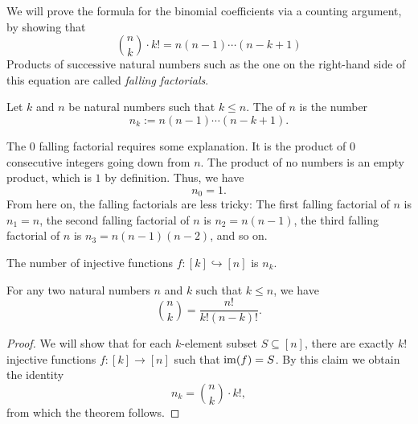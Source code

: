 We will prove the formula for the binomial coefficients via a counting argument, by showing that
\begin{equation*}
  \binom{n}{k}\cdot k!= n(n-1)\cdots (n-k+1)
\end{equation*}
Products of successive natural numbers such as the one on the right-hand side of this equation are called \emph{falling factorials}.

\begin{definition}
  Let $k$ and $n$ be natural numbers such that $k\leq n$. The  of $n$ is the number
  \begin{equation*}
    n_{k}:=n(n-1)\cdots (n-k+1).
  \end{equation*}
\end{definition}

The $0$\supth{} falling factorial requires some explanation. It is the product of $0$ consecutive integers going down from $n$. The product of no numbers is an empty product, which is $1$ by definition. Thus, we have
\begin{equation*}
  n_0=1.
\end{equation*}
From here on, the falling factorials are less tricky: The first falling factorial of $n$ is $n_1=n$, the second falling factorial of $n$ is $n_2=n(n-1)$, the third falling factorial of $n$ is $n_3=n(n-1)(n-2)$, and so on.

\begin{theorem}
  The number of injective functions $f:[k]\hookrightarrow[n]$ is $n_k$. 
\end{theorem}

\begin{theorem} For any two natural numbers $n$ and $k$ such that $k\leq n$, we have
  \begin{equation*}
    \binom{n}{k}=\frac{n!}{k!(n-k)!}.
  \end{equation*}
\end{theorem}

\begin{proof}
  We will show that for each $k$-element subset $S\subseteq [n]$, there are exactly $k!$ injective functions $f:[k]\to[n]$ such that $\mathrm{im}(f)=S$. By this claim we obtain the identity
  \begin{equation*}
    n_k=\binom{n}{k}\cdot k!,
  \end{equation*}
  from which the theorem follows.  
\end{proof}

